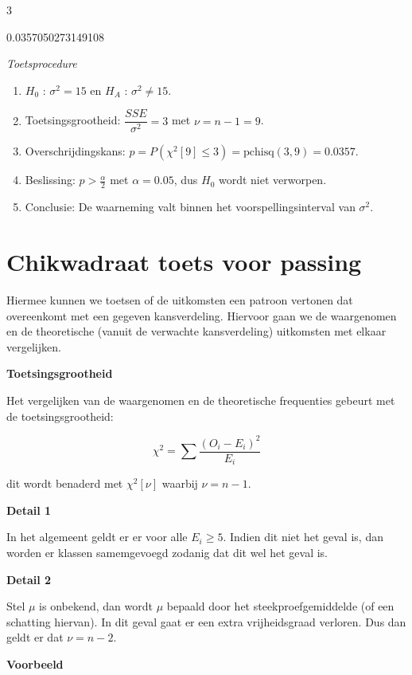 \documentclass[11pt]{article}
\providecommand{\tightlist}{%
      \setlength{\itemsep}{0pt}\setlength{\parskip}{0pt}}
\begin{document}
    3

    
    0.0357050273149108

    
    \emph{Toetsprocedure}

\begin{enumerate}
\def\labelenumi{\arabic{enumi}.}
\tightlist
\item
  \(H_0\) : \(\sigma^2 = 15\) en \(H_A\) : \(\sigma^2 \not= 15\).
\item
  Toetsingsgrootheid: \(\dfrac{SSE}{\sigma^2} = 3\) met \(\nu=n-1=9\).
\item
  Overschrijdingskans:
  \(p = P(\chi^2[9] \leq 3) = \textrm{pchisq}(3,9) = 0.0357\).
\item
  Beslissing: \(p > \frac{\alpha}{2}\) met \(\alpha=0.05\), dus \(H_0\)
  wordt niet verworpen.
\item
  Conclusie: De waarneming valt binnen het voorspellingsinterval van
  \(\sigma^2\).
\end{enumerate}

    \hypertarget{chikwadraat-toets-voor-passing}{%
\section{Chikwadraat toets voor
passing}\label{chikwadraat-toets-voor-passing}}

    Hiermee kunnen we toetsen of de uitkomsten een patroon vertonen dat
overeenkomt met een gegeven kansverdeling. Hiervoor gaan we de
waargenomen en de theoretische (vanuit de verwachte kansverdeling)
uitkomsten met elkaar vergelijken.

\textbf{Toetsingsgrootheid}

Het vergelijken van de waargenomen en de theoretische frequenties
gebeurt met de toetsingsgrootheid:

\[ \chi^2 = \sum \dfrac{(O_i-E_i)^2}{E_i} \]

dit wordt benaderd met \(\chi^2[\nu]\) waarbij \(\nu = n - 1\).

    \textbf{Detail 1}

In het algemeent geldt er er voor alle \(E_i \geq 5\). Indien dit niet
het geval is, dan worden er klassen samemgevoegd zodanig dat dit wel het
geval is.

\textbf{Detail 2}

Stel \(\mu\) is onbekend, dan wordt \(\mu\) bepaald door het
steekproefgemiddelde (of een schatting hiervan). In dit geval gaat er
een extra vrijheidsgraad verloren. Dus dan geldt er dat \(\nu = n-2\).

    \textbf{Voorbeeld}
\end{document}
